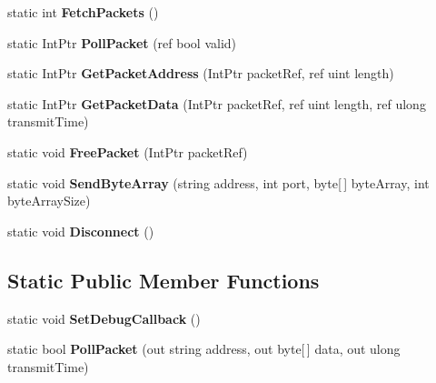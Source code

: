 \begin{DoxyCompactItemize}
\item 
\hypertarget{class_champ_net_plugin_1_1_network_a591fc1d265a3d980b5ea185100e1a3c9}{static int {\bfseries Fetch\-Packets} ()}\label{class_champ_net_plugin_1_1_network_a591fc1d265a3d980b5ea185100e1a3c9}

\item 
\hypertarget{class_champ_net_plugin_1_1_network_aa7cd4d50064649ad52aa1d4b4c43af3a}{static Int\-Ptr {\bfseries Poll\-Packet} (ref bool valid)}\label{class_champ_net_plugin_1_1_network_aa7cd4d50064649ad52aa1d4b4c43af3a}

\item 
\hypertarget{class_champ_net_plugin_1_1_network_a582632ef24eedc5973791aaedc4fcd7d}{static Int\-Ptr {\bfseries Get\-Packet\-Address} (Int\-Ptr packet\-Ref, ref uint length)}\label{class_champ_net_plugin_1_1_network_a582632ef24eedc5973791aaedc4fcd7d}

\item 
\hypertarget{class_champ_net_plugin_1_1_network_af6c381600f60a77db7c24d327c7c2c52}{static Int\-Ptr {\bfseries Get\-Packet\-Data} (Int\-Ptr packet\-Ref, ref uint length, ref ulong transmit\-Time)}\label{class_champ_net_plugin_1_1_network_af6c381600f60a77db7c24d327c7c2c52}

\item 
\hypertarget{class_champ_net_plugin_1_1_network_a230482602fa8f253b8d1f3d0a11780d3}{static void {\bfseries Free\-Packet} (Int\-Ptr packet\-Ref)}\label{class_champ_net_plugin_1_1_network_a230482602fa8f253b8d1f3d0a11780d3}

\item 
\hypertarget{class_champ_net_plugin_1_1_network_a018ec78857afa38d5f64607e63201abd}{static void {\bfseries Send\-Byte\-Array} (string address, int port, byte\mbox{[}$\,$\mbox{]} byte\-Array, int byte\-Array\-Size)}\label{class_champ_net_plugin_1_1_network_a018ec78857afa38d5f64607e63201abd}

\item 
\hypertarget{class_champ_net_plugin_1_1_network_a7f6c434b9b5587b34bd8a3f0d25488c4}{static void {\bfseries Disconnect} ()}\label{class_champ_net_plugin_1_1_network_a7f6c434b9b5587b34bd8a3f0d25488c4}

\end{DoxyCompactItemize}
\subsection*{Static Public Member Functions}
\begin{DoxyCompactItemize}
\item 
\hypertarget{class_champ_net_plugin_1_1_network_ad01cdffbb961d7aee298ad1a03e1047b}{static void {\bfseries Set\-Debug\-Callback} ()}\label{class_champ_net_plugin_1_1_network_ad01cdffbb961d7aee298ad1a03e1047b}

\item 
\hypertarget{class_champ_net_plugin_1_1_network_a3d42caa51e4fdc73edb33057cd34896b}{static bool {\bfseries Poll\-Packet} (out string address, out byte\mbox{[}$\,$\mbox{]} data, out ulong transmit\-Time)}\label{class_champ_net_plugin_1_1_network_a3d42caa51e4fdc73edb33057cd34896b}

\end{DoxyCompactItemize}


